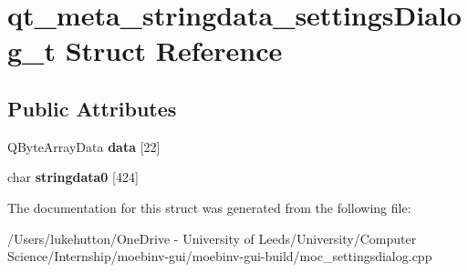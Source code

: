\hypertarget{structqt__meta__stringdata__settings_dialog__t}{}\section{qt\+\_\+meta\+\_\+stringdata\+\_\+settings\+Dialog\+\_\+t Struct Reference}
\label{structqt__meta__stringdata__settings_dialog__t}
\subsection*{Public Attributes}
\begin{DoxyCompactItemize}
\item 
\mbox{\label{structqt__meta__stringdata__settings_dialog__t_a2830fa81d51263ec2a64b8cf3fbe0101}} 
Q\+Byte\+Array\+Data {\bfseries data} \mbox{[}22\mbox{]}
\item 
\mbox{\label{structqt__meta__stringdata__settings_dialog__t_a5cf061ac496efadfbdef1d23b1f22afd}} 
char {\bfseries stringdata0} \mbox{[}424\mbox{]}
\end{DoxyCompactItemize}


The documentation for this struct was generated from the following file\+:\begin{DoxyCompactItemize}
\item 
/\+Users/lukehutton/\+One\+Drive -\/ University of Leeds/\+University/\+Computer Science/\+Internship/moebinv-\/gui/moebinv-\/gui-\/build/moc\+\_\+settingsdialog.\+cpp\end{DoxyCompactItemize}
